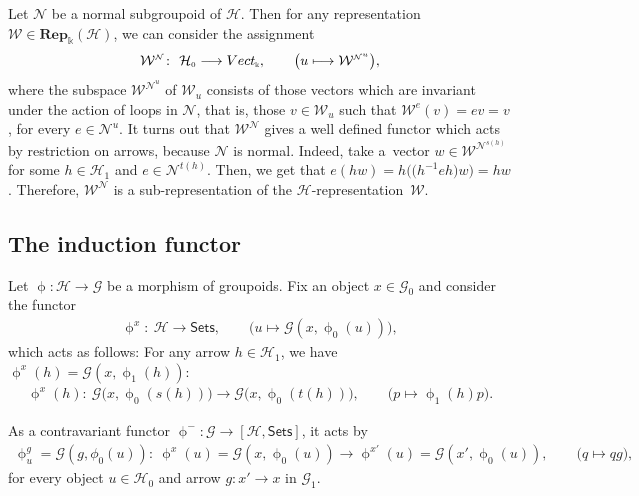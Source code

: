 \documentclass[11pt]{article}
\numberwithin{equation}{section}
\newcommand{\Rep}[1]{\mathbf{Rep}_{\Sscript{\Bbbk}}(#1)}
\newcommand{\Vect}{{\rm Vect}_{\Sscript{\Bbbk}}}
\newcommand{\Go}{\cG_{\Sscript{0}}}
\newcommand{\Ga}{\cG_{\Sscript{1}}}
\newcommand{\Ho}{\cH_{\Sscript{0}}}
\newcommand{\Ha}{\cH_{\Sscript{1}}}
\newcommand{\Wu}{\cW_{\Sscript{u}}}
\newcommand{\We}{\cW^{\Sscript{e}}}
\newcommand{\cG}{{\mathcal G}}
\newcommand{\cH}{{\mathcal H}}
\newcommand{\cN}{{\mathcal N}}
\newcommand{\cW}{{\mathcal W}}
\newcommand{\phix}{\upphi^{\Sscript{x}}}
\newcommand{\phixp}{\upphi^{\Sscript{x'}}}
\newcommand{\Sets}{\mathsf{Sets}}
\newcommand{\Sscript}[1]{\scriptscriptstyle{#1}}
\begin{document}
\begin{Remark}\label{rem:WN} Let $\cN$ be a normal subgroupoid of $\cH$. Then for any representation $\cW \in \Rep{\cH}$, we can consider the assignment
\begin{gather*}
\cW^{\Sscript{\cN}}\colon \ \Ho \longrightarrow \Vect, \qquad \big( u \longmapsto \cW^{\Sscript{\cN^u}} \big),
\end{gather*}
where the subspace $\cW^{\Sscript{\cN^u}}$ of $\Wu$ consists of those vectors which are invariant under the action of loops in $\cN$, that is, those $v \in \Wu$ such that $\We(v)=e v=v$, for every $e \in \cN^{\Sscript{u}}$. It turns out that $\cW^{\Sscript{\cN}}$ gives a well defined functor which acts by restriction on arrows, because $\cN$ is normal. Indeed, take a~vector $w \in \cW^{\Sscript{\cN^{s(h)}}}$ for some $h \in \Ha$ and $e \in \cN^{\Sscript{t(h)}}$. Then, we get that $e (h w)= h \big(\big(h^{-1}eh\big)w \big)=h w$. Therefore, $\cW^{\Sscript{\cN}}$ is a sub-representation of the $\cH$-representation~$\cW$.
\end{Remark}

\subsection{The induction functor}\label{ssec:Ind}
Let $\upphi: \cH \to \cG$ be a morphism of groupoids. Fix an object $x \in \Go$ and consider the functor
\begin{gather*}
\phix\colon \ \cH \longrightarrow \Sets, \qquad \big( u \longmapsto \cG(x,\upphi_{\Sscript{0}}(u)) \big),
\end{gather*}
which acts as follows: For any arrow $h\in \Ha$, we have $\phix(h)=\cG(x, \upphi_{\Sscript{1}}(h))$:
\begin{gather}\label{Eq:Tartu}
\phix(h) \colon \ \cG\big(x, \upphi_{\Sscript{0}}(s(h)) \big) \longrightarrow \cG\big(x, \upphi_{\Sscript{0}}(t(h)) \big), \qquad \big( p \longmapsto \upphi_{\Sscript{1}}(h) p\big).
\end{gather}

As a contravariant functor $\upphi^{-}\colon \cG \to \left[\cH, \Sets\right]$, it acts by
\begin{gather}\label{Eq:Oslo}
\upphi^{\Sscript{g}}_u=\cG(g,\phi_{\Sscript{0}}(u))\colon \ \phix(u)=\cG(x,\upphi_{\Sscript{0}}(u) ) \longrightarrow \phixp(u)=\cG(x',\upphi_{\Sscript{0}}(u)), \qquad \big( q \longmapsto q g \big),
\end{gather}
for every object $u \in \Ho$ and arrow $g\colon x' \to x$ in $\Ga$.
\end{document}
